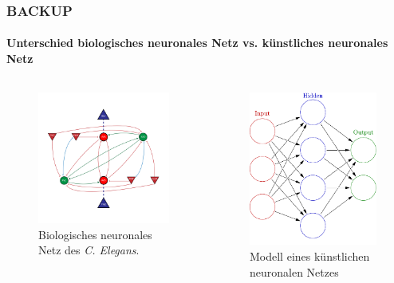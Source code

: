 \documentclass[10pt,t,aspectratio=1610]{beamer}
\newcommand{\ChapterBackup}{BACKUP}
\begin{document}
\begin{frame}[c]
\frametitle{\ChapterBackup}
\framesubtitle{Unterschied biologisches neuronales Netz vs. künstliches neuronales Netz}
\vspace{-0.5cm}
\begin{columns}[T,onlytextwidth]
	\begin{column}{0.4\textwidth}
		\begin{figure}[H] %
			\centering
			\includegraphics[width=6.5cm]{figures/Neural_Net_v3_ohneLegende.pdf}
			\caption{Biologisches neuronales Netz des \textit{C. Elegans}.}
			\label{fig:bnn_celegans}
		\end{figure}
	\end{column}
	\hspace{-1cm}
	\begin{column}{0.5\textwidth}
		\vspace{1.1cm}
		\begin{figure}[H] %
			\centering
			\includegraphics[width=4.5cm]{figures/Colored_neural_network.pdf}
			\caption{Modell eines künstlichen neuronalen Netzes}
			\label{fig:model_knn}
		\end{figure}
	\end{column}
\end{columns}
\end{frame}

\end{document}
